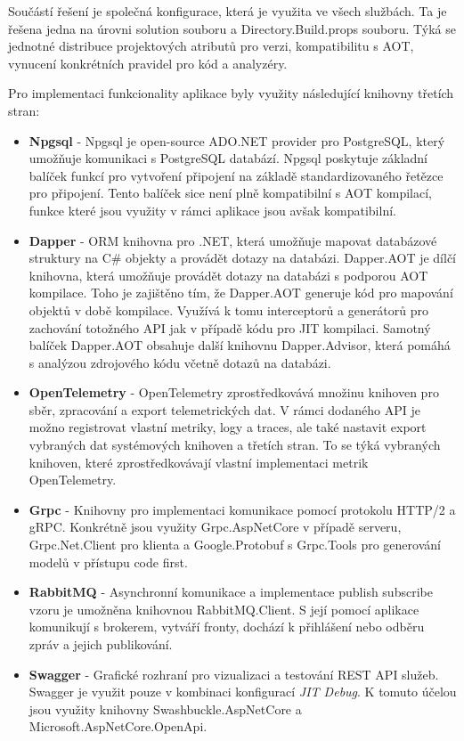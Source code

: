 Součástí řešení je společná konfigurace, která je využita ve všech službách. Ta je řešena jedna na úrovni solution souboru a Directory.Build.props souboru. Týká se jednotné distribuce projektových atributů pro verzi, kompatibilitu s AOT, vynucení konkrétních pravidel pro kód a analyzéry.


Pro implementaci funkcionality aplikace byly využity následující knihovny třetích stran:

\begin{itemize}
  \item \textbf{Npgsql} - Npgsql je open-source ADO.NET provider pro PostgreSQL, který umožňuje komunikaci s PostgreSQL databází. Npgsql poskytuje základní balíček funkcí pro vytvoření připojení na základě standardizovaného řetězce pro připojení. Tento balíček sice není plně kompatibilní s AOT kompilací, funkce které jsou využity v rámci aplikace jsou avšak kompatibilní.
  \item \textbf{Dapper} - ORM knihovna pro .NET, která umožňuje mapovat databázové struktury na C\# objekty a provádět dotazy na databázi. Dapper.AOT je dílčí knihovna, která umožňuje provádět dotazy na databázi s podporou AOT kompilace. Toho je zajištěno tím, že Dapper.AOT generuje kód pro mapování objektů v době kompilace. Využívá k tomu interceptorů a generátorů pro zachování totožného API jak v případě kódu pro JIT kompilaci. Samotný balíček Dapper.AOT obsahuje další knihovnu Dapper.Advisor, která pomáhá s analýzou zdrojového kódu včetně dotazů na databázi.
  \item \textbf{OpenTelemetry} - OpenTelemetry zprostředkovává množinu knihoven pro sběr, zpracování a export telemetrických dat. V rámci dodaného API je možno registrovat vlastní metriky, logy a traces, ale také nastavit export vybraných dat systémových knihoven a třetích stran. To se týká vybraných knihoven, které zprostředkovávají vlastní implementaci metrik OpenTelemetry.
  \item \textbf{Grpc} - Knihovny pro implementaci komunikace pomocí protokolu HTTP/2 a gRPC. Konkrétně jsou využity Grpc.AspNetCore v případě serveru, Grpc.Net.Client pro klienta a Google.Protobuf s Grpc.Tools pro generování modelů v přístupu code first.
  \item \textbf{RabbitMQ} - Asynchronní komunikace a implementace publish subscribe vzoru je umožněna knihovnou RabbitMQ.Client. S její pomocí aplikace komunikují s brokerem, vytváří fronty, dochází k přihlášení nebo odběru zpráv a jejich publikování.
  \item \textbf{Swagger} - Grafické rozhraní pro vizualizaci a testování REST API služeb. Swagger je využit pouze v kombinaci konfigurací \emph{JIT Debug}. K tomuto účelou jsou využity knihovny Swashbuckle.AspNetCore a Microsoft.AspNetCore.OpenApi.
\end{itemize}

